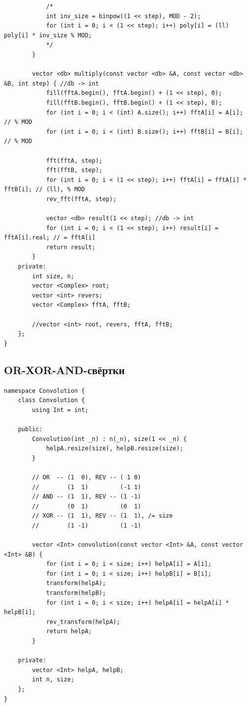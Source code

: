\documentclass[10pt, portrait,letterpaper]{article}
\begin{document}
\begin{verbatim}
            /*
            int inv_size = binpow((1 << step), MOD - 2);
            for (int i = 0; i < (1 << step); i++) poly[i] = (ll) poly[i] * inv_size % MOD;
            */
        }

        vector <db> multiply(const vector <db> &A, const vector <db> &B, int step) { //db -> int
            fill(fftA.begin(), fftA.begin() + (1 << step), 0);
            fill(fftB.begin(), fftB.begin() + (1 << step), 0);
            for (int i = 0; i < (int) A.size(); i++) fftA[i] = A[i]; // % MOD
            for (int i = 0; i < (int) B.size(); i++) fftB[i] = B[i]; // % MOD
            
            fft(fftA, step);
            fft(fftB, step);
            for (int i = 0; i < (1 << step); i++) fftA[i] = fftA[i] * fftB[i]; // (ll), % MOD
            rev_fft(fftA, step);

            vector <db> result(1 << step); //db -> int
            for (int i = 0; i < (1 << step); i++) result[i] = fftA[i].real; // = fftA[i]
            return result;
        }
    private:
        int size, n;
        vector <Complex> root;
        vector <int> revers;
        vector <Complex> fftA, fftB;

        //vector <int> root, revers, fftA, fftB;
    };
}
\end{verbatim}

\subsection{OR-XOR-AND-свёртки}

\begin{verbatim}
namespace Convolution {
    class Convolution {
        using Int = int;

    public:
        Convolution(int _n) : n(_n), size(1 << _n) {
            helpA.resize(size), helpB.resize(size);
        }

        // OR  -- (1  0), REV -- ( 1 0)
        //        (1  1)         (-1 1)
        // AND -- (1  1), REV -- (1 -1)
        //        (0  1)         (0  1)
        // XOR -- (1  1), REV -- (1  1), /= size
        //        (1 -1)         (1 -1)

        vector <Int> convolution(const vector <Int> &A, const vector <Int> &B) {
            for (int i = 0; i < size; i++) helpA[i] = A[i];
            for (int i = 0; i < size; i++) helpB[i] = B[i];
            transform(helpA);
            transform(helpB);
            for (int i = 0; i < size; i++) helpA[i] = helpA[i] * helpB[i];
            rev_transform(helpA);
            return helpA;
        }

    private:
        vector <Int> helpA, helpB;
        int n, size;
    };
}
\end{verbatim}
\end{document}
